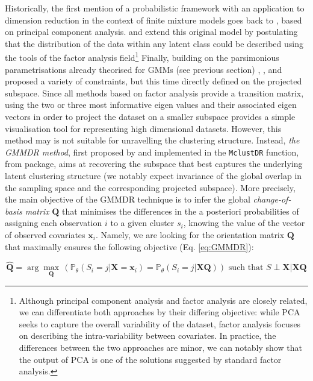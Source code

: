 Historically, the first mention of a probabilistic framework with an application to dimension reduction in the context of finite mixture models goes back to \autocite{tipping_bishop99}, based on principal component analysis. \autocite{mclachlan_etal03} and \autocite{mclachlan_peel00a} extend this original model by postulating that the distribution of the data within any latent class could be described using the tools of the factor analysis field\footnote{Although principal component analysis and factor analysis are closely related, we can differentiate both approaches by their differing objective: while PCA seeks to capture the overall variability of the dataset, factor analysis focuses on describing the intra-variability between covariates. In practice, the differences between the two approaches are minor, we can notably show that the output of PCA is one of the solutions suggested by standard factor analysis.} Finally, building on the parsimonious parametrisations already theorised for GMMs (see previous section) , \autocite{mcnicholas_murphy08}, \autocite{mcnicholas_etal10} and \autocite{bouveyron_etal07} proposed a variety of constraints, but this time directly defined on the projected subspace. Since all methods based on factor analysis provide a transition matrix, using the two or three most informative eigen values and their associated eigen vectors in order to project the dataset on a smaller subspace provides a simple visualisation tool for representing high dimensional datasets.
However, this method may is not suitable for unravelling the clustering structure. Instead, \emph{the GMMDR method}, first proposed by \autocite{scrucca10} and implemented in the \texttt{MclustDR} function, from  package, aims at recovering the subspace that best captures the underlying latent clustering structure (we notably expect invariance of the global overlap in the sampling space and the corresponding projected subspace). More precisely, the main objective of the GMMDR technique is to infer the global \emph{change-of-basis matrix} \(\boldsymbol{Q}\) that minimises the differences in the a posteriori probabilities of assigning each observation \(i\) to a given cluster \(s_i\), knowing the value of the vector of observed covariates \(\boldsymbol{x}_i\). Namely, we are looking for the orientation matrix \(\boldsymbol{Q}\) that maximally ensures the following objective (Eq. \eqref{eq:GMMDR}):

\begin{equation}
 \hat{\boldsymbol{Q}} = \arg \max_{\boldsymbol{Q}} \,  \left(\mathbb{P}_{\theta} (S_i=j | \boldsymbol{X} =\boldsymbol{x}_i) = \mathbb{P}_{\theta} (S_i=j | \boldsymbol{X} \boldsymbol{Q}) \right)
\text{ such that } S \perp \boldsymbol{X} | \boldsymbol{X} \boldsymbol{Q}
    \label{eq:GMMDR}
\end{equation}

